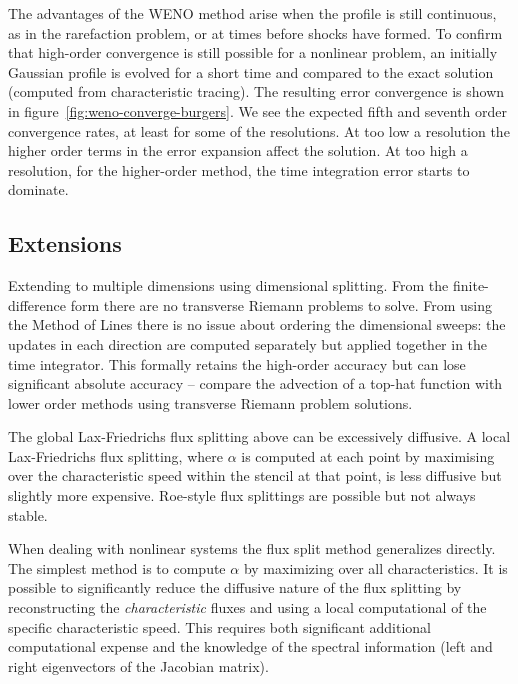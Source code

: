 The advantages of the WENO method arise when the profile is still continuous, as
in the rarefaction problem, or at times before shocks have formed. To confirm
that high-order convergence is still possible for a nonlinear problem, an
initially Gaussian profile is evolved for a short time and compared to the
exact solution (computed from characteristic tracing). The resulting error
convergence is shown in figure~\ref{fig:weno-converge-burgers}. We see the
expected fifth and seventh order convergence rates, at least for some of the
resolutions. At too low a resolution the higher order terms in the error
expansion affect the solution. At too high a resolution, for the higher-order
method, the time integration error starts to dominate.

\subsection{Extensions}

Extending to multiple dimensions using dimensional splitting. From the
finite-difference form there are no transverse Riemann problems to solve. From
using the Method of Lines there is no issue about ordering the dimensional
sweeps: the updates in each direction are computed separately but applied
together in the time integrator. This formally retains the high-order accuracy
but can lose significant absolute accuracy -- compare the advection of a
top-hat function with lower order methods using transverse Riemann problem
solutions.

The global Lax-Friedrichs flux splitting above can be excessively diffusive. A
local Lax-Friedrichs flux splitting, where $\alpha$ is computed at each point
by maximising over the characteristic speed within the stencil at that point, is
less diffusive but slightly more expensive. Roe-style flux splittings are
possible but not always stable.

When dealing with nonlinear systems the flux split method generalizes directly.
The simplest method is to compute $\alpha$ by maximizing over all
characteristics. It is possible to significantly reduce the diffusive nature of
the flux splitting by reconstructing the \emph{characteristic} fluxes and using
a local computational of the specific characteristic speed. This requires both
significant additional computational expense and the knowledge of the spectral
information (left and right eigenvectors of the Jacobian matrix).
